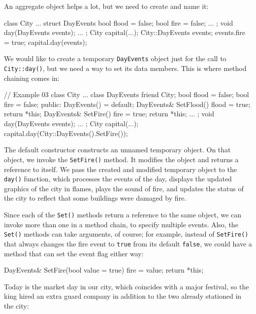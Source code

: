 An aggregate object helps a lot, but we need to create and name it:

\begin{code}
class City {
  ...
  struct DayEvents {
    bool flood = false;
    bool fire = false;
    ...
  };
  void day(DayEvents events);
  ...
};
City capital(...);
City::DayEvents events;
events.fire = true;
capital.day(events);
\end{code}

We would like to create a temporary \texttt{DayEvents} object just for the call to \texttt{City::day()}, but we need a way to set its data members. This is where method chaining comes in:

\begin{code}
// Example 03
class City {
  ...
  class DayEvents {
    friend City;
    bool flood = false;
    bool fire = false;
    public:
    DayEvents() = default;
    DayEvents& SetFlood() { flood = true; return *this; }
    DayEvents& SetFire() { fire = true; return *this; }
    ...
  };
  void day(DayEvents events);
  ...
};
City capital(...);
capital.day(City::DayEvents().SetFire());
\end{code}

The default constructor constructs an unnamed temporary object. On that object, we invoke the \texttt{SetFire()} method. It modifies the object and returns a reference to itself. We pass the created and modified temporary object to the \texttt{day()} function, which processes the events of the day, displays the updated graphics of the city in flames, plays the sound of fire, and updates the status of the city to reflect that some buildings were damaged by fire.

Since each of the \texttt{Set()} methods return a reference to the same object, we can invoke more than one in a method chain, to specify multiple events. Also, the \texttt{Set()} methods can take arguments, of course; for example, instead of \texttt{SetFire()} that always changes the fire event to \texttt{true} from its default \texttt{false}, we could have a method that can set the event flag either way:

\begin{code}
DayEvents& SetFire(bool value = true) {
  fire = value;
  return *this;
}
\end{code}

Today is the market day in our city, which coincides with a major festival, so the king hired an extra guard company in addition to the two already stationed in the city:

